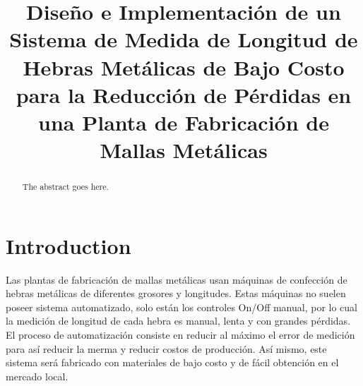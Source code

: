\documentclass[conference]{IEEEtran}
\begin{document}
%
\title{Diseño e Implementación de un Sistema de Medida de Longitud de Hebras Metálicas de Bajo Costo para la Reducción de Pérdidas en una Planta de Fabricación de Mallas Metálicas}


\author{
\and

}



\maketitle


\begin{abstract}
The abstract goes here.
\end{abstract}


%
\IEEEpeerreviewmaketitle

\section{Introduction}
Las plantas de fabricación de mallas metálicas usan máquinas de 
confección de hebras metálicas de diferentes grosores y 
longitudes. Estas máquinas no suelen poseer sistema 
automatizado, solo están los controles On/Off manual, por lo 
cual la medición de longitud de cada hebra es manual, lenta y con 
grandes pérdidas. El proceso de automatización
consiste en reducir al máximo el error de medición para así 
reducir la merma y reducir costos de producción. Así mismo, este 
sistema será fabricado con materiales de bajo costo y de fácil 
obtención en el mercado local.
\end{document}
